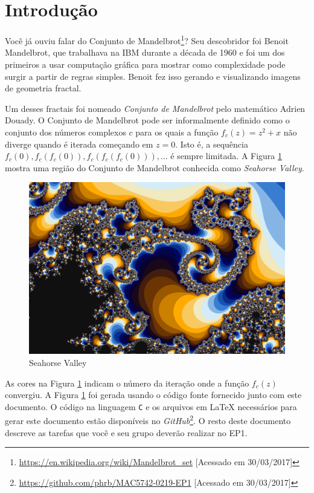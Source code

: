 \documentclass[final,12pt,a4paper]{elsarticle}
\begin{document}

\section{Introdução}

Você já ouviu falar do Conjunto de
Mandelbrot\footnote{\url{https://en.wikipedia.org/wiki/Mandelbrot_set}
[Acessado em 30/03/2017]}?  Seu descobridor foi Benoit Mandelbrot, que
trabalhava na IBM durante a década de 1960 e foi um dos primeiros a usar
computação gráfica para mostrar como complexidade pode surgir a partir de
regras simples. Benoit fez isso gerando e visualizando imagens de geometria
fractal.

Um desses fractais foi nomeado \textit{Conjunto de Mandelbrot} pelo matemático
Adrien Douady.  O Conjunto de Mandelbrot pode ser informalmente definido como o
conjunto dos números complexos $c$ para os quais a função $f_c(z) = z^2 + x$
não diverge quando é iterada começando em $z = 0$. Isto é, a sequência $f_c(0),
f_c(f_c(0)), f_c(f_c(f_c(0))),\dots$ é sempre limitada. A Figura
\ref{fig:header} mostra uma região do Conjunto de Mandelbrot conhecida
como \textit{Seahorse Valley}.

\begin{figure}[htpb]
    \centering
    \includegraphics[width=.82\textwidth]{seahorse}
    \caption{Seahorse Valley}
    \label{fig:header}
\end{figure}

As cores na Figura \ref{fig:header} indicam o número da iteração onde a
função $f_c(z)$ convergiu. A Figura \ref{fig:header} foi gerada usando o
código fonte fornecido junto com este documento. O código na linguagem
\texttt{C} e os arquivos em \LaTeX{} necessários para gerar este documento
estão disponíveis no
\textit{GitHub}\footnote{\url{https://github.com/phrb/MAC5742-0219-EP1}
[Acessado em 30/03/2017]}. O resto deste documento descreve as tarefas que você
e seu grupo deverão realizar no EP1.
\end{document}
